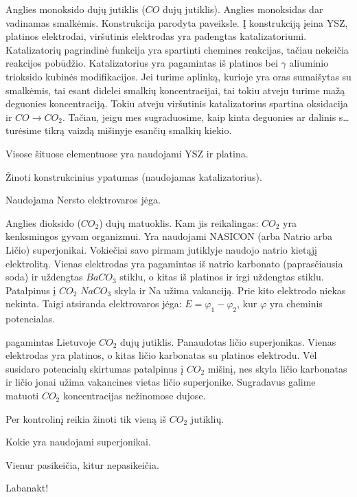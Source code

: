 Anglies monoksido dujų jutiklis ($CO$ dujų jutiklis). Anglies
monoksidas dar vadinamas smalkėmis. Konstrukcija parodyta 
paveiksle. Į konstrukciją įeina YSZ, platinos elektrodai, viršutinis
elektrodas yra padengtas katalizatoriumi. Katalizatorių pagrindinė
funkcija yra spartinti chemines reakcijas, tačiau nekeičia reakcijos
pobūdžio. Katalizatorius yra pagamintas iš platinos bei $\gamma$ aliuminio
trioksido kubinės modifikacijos. Jei turime aplinką, kurioje yra oras
sumaišytas su smalkėmis, tai esant didelei smalkių koncentracijai,
tai tokiu atveju turime mažą deguonies koncentraciją. Tokiu atveju
viršutinis katalizatorius spartina oksidacija ir $CO \to CO_{2}$.
Tačiau, jeigu mes sugraduosime, kaip kinta deguonies ar dalinis
s… turėsime tikrą vaizdą mišinyje esančių smalkių kiekio.

Visose šituose elementuose yra naudojami YSZ ir platina.

\begin{remember}
  \item Žinoti konstrukcinius ypatumas (naudojamas katalizatorius).
  \item Naudojama Nersto elektrovaros jėga.
\end{remember}

Anglies dioksido ($CO_{2}$) dujų matuoklis. Kam jis reikalingas:
$CO_{2}$ yra kenksmingos gyvam organizmui. Yra naudojami
NASICON (arba Natrio arba Ličio) superjonikai. Vokiečiai savo
pirmam jutiklyje naudojo natrio kietąjį elektrolitą. Vienas elektrodas
yra pagamintas iš natrio karbonato (paprasčiausia soda) ir uždengtas
$BaCO_{3}$ stiklu, o kitas iš platinos ir irgi uždengtas stiklu.
Patalpinus į $CO_{2}$ $NaCO_{3}$ skyla ir Na užima vakanciją.
Prie kito elektrodo niekas nekinta. Taigi atsiranda elektrovaros
jėga: $E = \varphi_{1} - \varphi_{2}$, kur $\varphi$ yra cheminis
potencialas.

 pagamintas Lietuvoje $CO_{2}$ dujų jutiklis. Panaudotas
ličio superjonikas. Vienas elektrodas yra platinos, o kitas ličio
karbonatas su platinos elektrodu. Vėl susidaro potencialų skirtumas
patalpinus į $CO_{2}$ mišinį, nes skyla ličio karbonatas ir ličio
jonai užima vakancines vietas ličio superjonike. Sugradavus
galime matuoti $CO_{2}$ koncentracijas nežinomose dujose.

\begin{note}
  Per kontrolinį reikia žinoti tik vieną iš $CO_{2}$ jutiklių.
\end{note}

\begin{remember}
  \item Kokie yra naudojami superjonikai.
  \item Vienur pasikeičia, kitur nepasikeičia.
  \item Labanakt!
\end{remember}


